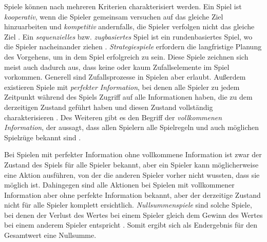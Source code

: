 Spiele können nach mehreren Kriterien charakterisiert werden. Ein Spiel ist \emph{kooperativ}, wenn die Spieler gemeinsam versuchen auf das gleiche Ziel hinzuarbeiten und \emph{kompetitiv} andernfalls, \dash die Spieler verfolgen nicht das gleiche Ziel \cite{2018.CooperativeGames}. Ein \emph{sequenzielles} bzw. \emph{zugbasiertes} Spiel ist ein rundenbasiertes Spiel, wo die Spieler nacheinander ziehen \cite[S. 251]{2018.SequentialGame}. \emph{Strategiespiele} erfordern die langfristige Planung des Vorgehens, um in dem Spiel erfolgreich zu sein. Diese Spiele zeichnen sich meist auch dadurch aus, dass keine oder kaum Zufallselemente im Spiel vorkommen. Generell sind Zufallsprozesse in Spielen aber erlaubt. Außerdem existieren Spiele mit \emph{perfekter Information}, bei denen alle Spieler zu jedem Zeitpunkt während des Spiels Zugriff auf alle Informationen haben, die zu dem derzeitigen Zustand geführt haben und diesen Zustand vollständig charakterisieren \cite[S. 156]{1194.SearchAndAiInGames}. Des Weiteren gibt es den Begriff der \emph{vollkommenen Information}, der aussagt, dass allen Spielern alle Spielregeln und auch möglichen Spielzüge bekannt sind \cite[S. 1]{2017.AlphaBeta}.

Bei Spielen mit perfekter Information ohne vollkommene Information ist zwar der Zustand des Spiels für alle Spieler bekannt, aber ein Spieler kann möglicherweise eine Aktion ausführen, von der die anderen Spieler vorher nicht wussten, dass sie möglich ist. Dahingegen sind alle Aktionen bei Spielen mit vollkommener Information aber ohne perfekte Information bekannt, aber der derzeitige Zustand nicht für alle Spieler komplett ersichtlich. \emph{Nullsummenspiele} sind solche Spiele, bei denen der Verlust des Wertes bei einem Spieler gleich dem Gewinn des Wertes bei einem anderem Spieler entspricht \cite{2022.ZeroSumGame}. Somit ergibt sich als Endergebnis für den Gesamtwert eine Nullsumme.

